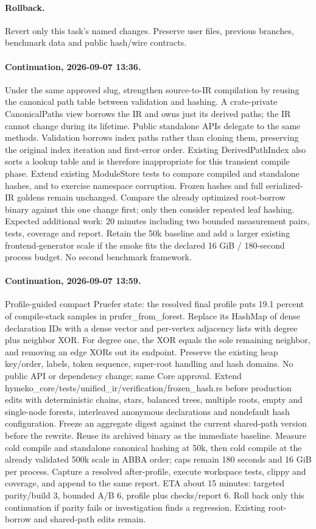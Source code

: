 \documentclass[11pt,a4paper]{article}
\begin{document}
\paragraph{Rollback.} Revert only this task's named changes. Preserve user files,
previous branches, benchmark data and public hash/wire contracts.
\paragraph{Continuation, 2026-09-07 13:36.} Under the same approved slug, strengthen
source-to-IR compilation by reusing the canonical path table between validation and
hashing. A crate-private CanonicalPaths view borrows the IR and owns just its derived
paths; the IR cannot change during its lifetime. Public standalone APIs delegate to
the same methods. Validation borrows index paths rather than cloning them, preserving
the original index iteration and first-error order. Existing DerivedPathIndex also
sorts a lookup table and is therefore inappropriate for this transient compile phase.
Extend existing ModuleStore tests to compare compiled and standalone hashes, and to
exercise namespace corruption. Frozen hashes and full serialized-IR goldens remain
unchanged. Compare the already optimized root-borrow binary against this one change
first; only then consider repeated leaf hashing. Expected additional work: 20 minutes
including two bounded measurement pairs, tests, coverage and report. Retain the
50k baseline and add a larger existing frontend-generator scale if the smoke fits
the declared 16 GiB / 180-second process budget. No second benchmark framework.
\paragraph{Continuation, 2026-09-07 13:59.} Profile-guided compact Pruefer state:
the resolved final profile puts 19.1 percent of compile-stack samples in
prufer\_from\_forest. Replace its HashMap of dense declaration IDs with a dense
vector and per-vertex adjacency lists with degree plus neighbor XOR. For degree one,
the XOR equals the sole remaining neighbor, and removing an edge XORs out its
endpoint. Preserve the existing heap key/order, labels, token sequence, super-root
handling and hash domains. No public API or dependency change; same Core approval.
Extend hymeko\_core/tests/unified\_ir/verification/frozen\_hash.rs before production edits with deterministic
chains, stars, balanced trees, multiple roots, empty and single-node forests,
interleaved anonymous declarations and nondefault hash configuration. Freeze an
aggregate digest against the current shared-path version before the rewrite.
Reuse its archived binary as the immediate baseline. Measure cold compile and
standalone canonical hashing at 50k, then cold compile at the already validated
500k scale in ABBA order; caps remain 180 seconds and 16 GiB per process. Capture
a resolved after-profile, execute workspace tests, clippy and coverage, and append
to the same report. ETA about 15 minutes: targeted parity/build 3, bounded A/B 6,
profile plus checks/report 6. Roll back only this continuation if parity fails or
investigation finds a regression. Existing root-borrow and shared-path edits remain.
\end{document}
